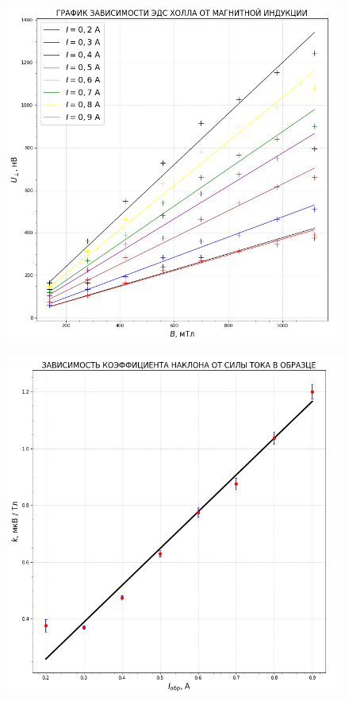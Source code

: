 \documentclass[a4paper,12pt]{article}
\begin{document}
\begin{figure}[H]\label{fig: U(B)) Cu}
    \centering
    \includegraphics[width = 1.\textwidth]{U(B)_Cu.png}
\end{figure}
\newpage
\begin{figure}[H]\label{fig: k(I) Cu}
    \centering
    \includegraphics[width = 1.\textwidth]{k(I)_Cu.png}
\end{figure}
\newpage
\end{document}
